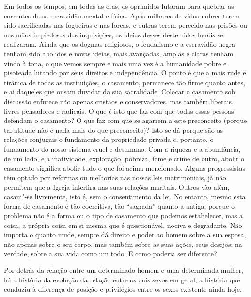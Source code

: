 Em todos os tempos, em todas as eras, os oprimidos lutaram para quebrar
as correntes dessa escravidão mental e física. Após milhares de vidas
nobres terem sido sacrificadas nas fogueiras e nas forcas, e outras
terem perecido nas prisões ou nas mãos impiedosas das inquisições, as
ideias desses destemidos heróis se realizaram. Ainda que os
dogmas religiosos, o feudalismo e a escravidão negra tenham sido abolidos e
novas ideias, mais avançadas, amplas e claras tenham vindo à tona, o que vemos
sempre e mais uma vez é a humanidade pobre e pisoteada lutando por seus
direitos e independência. O ponto é que a mais rude e tirânica de todas
as instituições, o casamento, permanece tão firme quanto antes, e ai
daqueles que ousam duvidar da sua sacralidade. Colocar o casamento sob
discussão enfurece não apenas cristãos e conservadores, mas também
liberais, livres pensadores e radicais. O que é isto que faz com que
todas essas pessoas defendam o casamento? O que faz com que se agarrem a
este preconceito (porque tal atitude não é nada mais do que
preconceito)? Isto se dá porque são as relações conjugais o fundamento
da propriedade privada e, portanto, o fundamento do nosso sistema cruel
e desumano. Com a riqueza e a abundância, de um lado, e a inatividade,
exploração, pobreza, fome e crime de outro, abolir o casamento significa
abolir tudo o que foi acima mencionado. Alguns progressistas têm optado
por reformas ou melhorias nas nossas leis matrimoniais, já não permitem
que a Igreja interfira nas suas relações maritais. Outros vão além,
casam"-se livremente, isto é, sem o consentimento da lei. No entanto,
mesmo esta forma de casamento é tão coercitiva, tão ``sagrada'' quanto
a antiga, porque o problema não é a forma ou o tipo de casamento que
podemos estabelecer, mas a coisa, a própria coisa em si mesma que é
questionável, nociva e degradante. Não importa o quanto mude, sempre dá
direito e poder ao homem sobre a sua esposa, não apenas sobre o seu corpo,
mas também sobre as suas ações, seus desejos; na verdade, sobre a sua vida
como um todo. E como poderia ser diferente?

Por detrás da relação entre um determinado homem e uma determinada
mulher, há a história da evolução da relação entre os dois sexos em
geral, a história que conduziu à diferença de posição e privilégios
entre os sexos existente ainda hoje.


